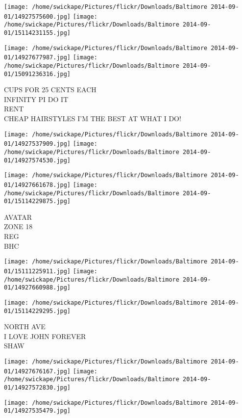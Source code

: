 \documentclass[10pt,letterpaper]{article}
\begin{document}
\texttt{[image: /home/swickape/Pictures/flickr/Downloads/Baltimore 2014-09-01/14927575600.jpg]}
\texttt{[image: /home/swickape/Pictures/flickr/Downloads/Baltimore 2014-09-01/15114231155.jpg]}

\texttt{[image: /home/swickape/Pictures/flickr/Downloads/Baltimore 2014-09-01/14927677987.jpg]}
\texttt{[image: /home/swickape/Pictures/flickr/Downloads/Baltimore 2014-09-01/15091236316.jpg]}

CUPS FOR 25 CENTS EACH\\
INFINITY PI DO IT\\
RENT\\
CHEAP HAIRSTYLES I'M THE BEST AT WHAT I DO!\\
\pagebreak

\texttt{[image: /home/swickape/Pictures/flickr/Downloads/Baltimore 2014-09-01/14927537909.jpg]}
\texttt{[image: /home/swickape/Pictures/flickr/Downloads/Baltimore 2014-09-01/14927574530.jpg]}

\texttt{[image: /home/swickape/Pictures/flickr/Downloads/Baltimore 2014-09-01/14927661678.jpg]}
\texttt{[image: /home/swickape/Pictures/flickr/Downloads/Baltimore 2014-09-01/15114229875.jpg]}

AVATAR\\
ZONE 18\\
REG\\
BHC\\
\pagebreak

\texttt{[image: /home/swickape/Pictures/flickr/Downloads/Baltimore 2014-09-01/15111225911.jpg]}
\texttt{[image: /home/swickape/Pictures/flickr/Downloads/Baltimore 2014-09-01/14927660988.jpg]}

\vspace{0.25in}
\texttt{[image: /home/swickape/Pictures/flickr/Downloads/Baltimore 2014-09-01/15114229295.jpg]}

NORTH AVE\\
I LOVE JOHN FOREVER\\
SHAW\\
\pagebreak

\texttt{[image: /home/swickape/Pictures/flickr/Downloads/Baltimore 2014-09-01/14927676167.jpg]}
\texttt{[image: /home/swickape/Pictures/flickr/Downloads/Baltimore 2014-09-01/14927572830.jpg]}

\texttt{[image: /home/swickape/Pictures/flickr/Downloads/Baltimore 2014-09-01/14927535479.jpg]}
\end{document}
